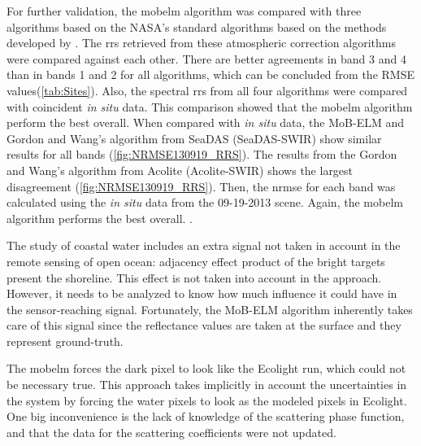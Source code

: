For further validation, the \gls{mobelm} algorithm was compared with three algorithms based on the NASA's standard algorithms based on the methods developed by \cite{Gordon:1994}. The \gls{rrs} retrieved from these atmospheric correction algorithms were compared against each other. There are better agreements in band 3 and 4 than in bands 1 and 2 for all algorithms, which can be concluded from the RMSE values(\autoref{tab:Sites}). Also, the spectral \gls{rrs} from all four algorithms were compared with coincident {\it in situ} data. This comparison showed that the \gls{mobelm} algorithm perform the best overall.  When compared with {\it in situ} data, the MoB-ELM and Gordon and Wang's algorithm from SeaDAS (SeaDAS-SWIR) show similar results for all bands (\autoref{fig:NRMSE130919_RRS}). The results from the Gordon and Wang's algorithm from Acolite (Acolite-SWIR) shows the largest disagreement (\autoref{fig:NRMSE130919_RRS}). Then, the \gls{nrmse} for each band was calculated using the {\it in situ} data from the 09-19-2013 scene. Again, the \gls{mobelm} algorithm performs the best overall. .

The study of coastal water includes an extra signal not taken in account in the remote sensing of open ocean: adjacency effect product of the bright targets present the shoreline. This effect is not taken into account in the \cite{Gordon:1994} approach. However, it needs to be analyzed to know how much influence it could have in the sensor-reaching signal. Fortunately, the MoB-ELM algorithm inherently takes care of this signal since the reflectance values are taken at the surface and they represent ground-truth.


The \gls{mobelm} forces the dark pixel to look like the Ecolight run, which could not be necessary true. This approach takes implicitly in account the uncertainties in the system by forcing the water pixels to look as the modeled pixels in Ecolight. One big inconvenience is the lack of knowledge of the scattering phase function, and that the data for the scattering coefficients were not updated.

